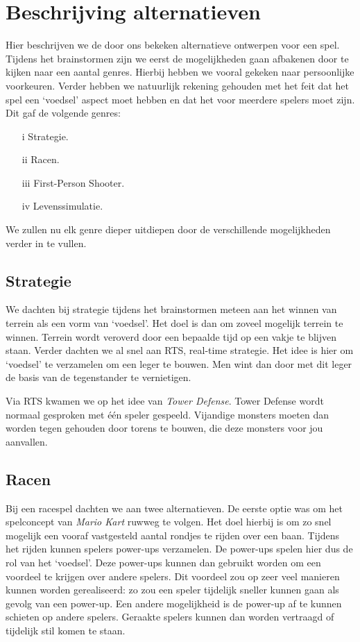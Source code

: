     \section{Beschrijving alternatieven}
    \label{app:alternatieven}
    Hier beschrijven we de door ons bekeken alternatieve ontwerpen voor een spel. Tijdens het brainstormen zijn we eerst de mogelijkheden gaan afbakenen door te kijken naar een aantal genres. Hierbij hebben we vooral gekeken naar persoonlijke voorkeuren. Verder hebben we natuurlijk rekening gehouden met het feit dat het spel een `voedsel' aspect moet hebben en dat het voor meerdere spelers moet zijn. Dit gaf de volgende genres:
    \begin{enumerate}
    \item[i] Strategie.
    \item[ii] Racen.
    \item[iii] First-Person Shooter.
    \item[iv] Levenssimulatie.
    \end{enumerate}
    We zullen nu elk genre dieper uitdiepen door de verschillende mogelijkheden verder in te vullen.

    \subsection{Strategie}
    We dachten bij strategie tijdens het brainstormen meteen aan het winnen van terrein als een vorm van `voedsel'. Het doel is dan om zoveel mogelijk terrein te winnen. Terrein wordt veroverd door een bepaalde tijd op een vakje te blijven staan. Verder dachten we al snel aan RTS, real-time strategie. Het idee is hier om `voedsel' te verzamelen om een leger te bouwen. Men wint dan door met dit leger de basis van de tegenstander te vernietigen.

    Via RTS kwamen we op het idee van \emph{Tower Defense}. Tower Defense wordt normaal gesproken met \'e\'en speler gespeeld. Vijandige monsters moeten dan worden tegen gehouden door torens te bouwen, die deze monsters voor jou aanvallen.

    \subsection{Racen}
    Bij een racespel dachten we aan twee alternatieven. De eerste optie was om het spelconcept van \emph{Mario Kart} ruwweg te volgen. Het doel hierbij is om zo snel mogelijk een vooraf vastgesteld aantal rondjes te rijden over een baan. Tijdens het rijden kunnen spelers power-ups verzamelen. De power-ups spelen hier dus de rol van het `voedsel'. Deze power-ups kunnen dan gebruikt worden om een voordeel te krijgen over andere spelers. Dit voordeel zou op zeer veel manieren kunnen worden gerealiseerd: zo zou een speler tijdelijk sneller kunnen gaan als gevolg van een power-up. Een andere mogelijkheid is de power-up af te kunnen schieten op andere spelers. Geraakte spelers kunnen dan worden vertraagd of tijdelijk stil komen te staan.

